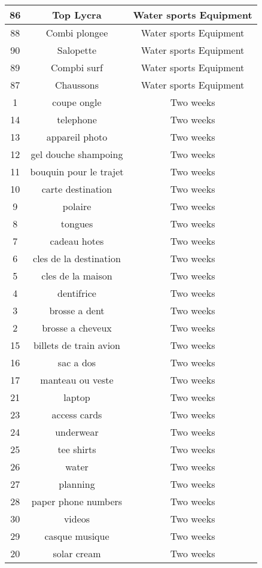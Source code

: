 \begin{longtable}{|c|c|c|}
\hline
86 & Top Lycra & Water sports Equipment\\
\hline
88 & Combi plongee & Water sports Equipment\\
\hline
90 & Salopette & Water sports Equipment\\
\hline
89 & Compbi surf & Water sports Equipment\\
\hline
87 & Chaussons & Water sports Equipment\\
\hline
1 & coupe ongle & Two weeks\\
\hline
14 & telephone & Two weeks\\
\hline
13 & appareil photo & Two weeks\\
\hline
12 & gel douche shampoing & Two weeks\\
\hline
11 & bouquin pour le trajet & Two weeks\\
\hline
10 & carte destination & Two weeks\\
\hline
9 & polaire & Two weeks\\
\hline
8 & tongues & Two weeks\\
\hline
7 & cadeau hotes & Two weeks\\
\hline
6 & cles de la destination & Two weeks\\
\hline
5 & cles de la maison & Two weeks\\
\hline
4 & dentifrice & Two weeks\\
\hline
3 & brosse a dent & Two weeks\\
\hline
2 & brosse a cheveux & Two weeks\\
\hline
15 & billets de train avion & Two weeks\\
\hline
16 & sac a dos & Two weeks\\
\hline
17 & manteau ou veste  & Two weeks\\
\hline
21 & laptop & Two weeks\\
\hline
23 & access cards & Two weeks\\
\hline
24 & underwear & Two weeks\\
\hline
25 & tee shirts & Two weeks\\
\hline
26 & water & Two weeks\\
\hline
27 & planning & Two weeks\\
\hline
28 & paper phone numbers & Two weeks\\
\hline
30 & videos & Two weeks\\
\hline
29 & casque musique & Two weeks\\
\hline
20 & solar cream & Two weeks\\
\hline

\end{longtable}
